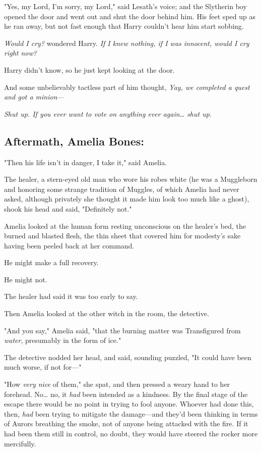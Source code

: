 "Yes, my Lord, I'm sorry, my Lord," said Lesath's voice; and the Slytherin boy 
opened the door and went out and shut the door behind him. His feet sped up as 
he ran away, but not fast enough that Harry couldn't hear him start sobbing.

\emph{Would I cry?} wondered Harry. \emph{If I knew nothing, if I was innocent, 
would I cry right now?}

Harry didn't know, so he just kept looking at the door.

And some unbelievably tactless part of him thought, \emph{Yay, we completed a 
quest and got a minion---}

\emph{Shut up. If you ever want to vote on anything ever again{\ldots} shut up.}
\sbreak
\vspace{-2\baselineskip}
\subsection{Aftermath, Amelia Bones:}

"Then his life isn't in danger, I take it," said Amelia.

The healer, a stern-eyed old man who wore his robes white (he was a Muggleborn 
and honoring some strange tradition of Muggles, of which Amelia had never 
asked, although privately she thought it made him look too much like a ghost), 
shook his head and said, "Definitely not."

Amelia looked at the human form resting unconscious on the healer's bed, the 
burned and blasted flesh, the thin sheet that covered him for modesty's sake 
having been peeled back at her command.

He might make a full recovery.

He might not.

The healer had said it was too early to say.

Then Amelia looked at the other witch in the room, the detective.

"And you say," Amelia said, "that the burning matter was Transfigured from 
\emph{water}, presumably in the form of ice."

The detective nodded her head, and said, sounding puzzled, "It could have been 
much worse, if not for---"

"How \emph{very nice} of them," she spat, and then pressed a weary hand to her 
forehead. No{\ldots} no, it \emph{had} been intended as a kindness. By the 
final stage of the escape there would be no point in trying to fool anyone. 
Whoever had done this, then, \emph{had} been trying to mitigate the 
damage---and they'd been thinking in terms of Aurors breathing the smoke, not 
of anyone being attacked with the fire. If it had been them still in control, 
no doubt, they would have steered the rocker more mercifully.

